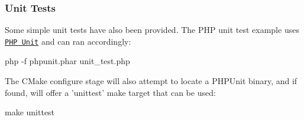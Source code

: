 \subsubsection*{Unit Tests}

Some simple unit tests have also been provided. The P\-H\-P unit test example uses \href{https://phpunit.de}{\tt P\-H\-P Unit} and can ran accordingly\-: \begin{DoxyVerb}php -f phpunit.phar unit_test.php
\end{DoxyVerb}


The C\-Make configure stage will also attempt to locate a P\-H\-P\-Unit binary, and if found, will offer a 'unittest' make target that can be used\-: \begin{DoxyVerb}make unittest\end{DoxyVerb}
 